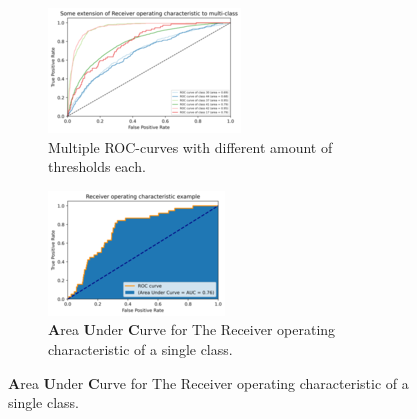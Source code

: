 \begin{figure}[H]
	\caption{ROC example}
	\begin{subfigure}[t]{0.49\hsize}\centering
		\includegraphics[width=1\linewidth]{bilder/ROC-Curve-Example.png}
		\caption{Multiple ROC-curves with different amount of thresholds each.}
		\label{plot:roc-multi}	
	\end{subfigure}%
	\hfill
	\begin{subfigure}[t]{0.49\hsize}\centering	
		\includegraphics[width=1\linewidth]{bilder/ROC-Area-Example.png}
		\caption{\textbf{A}rea \textbf{U}nder \textbf{C}urve for The Receiver operating characteristic of a single class.}
		\label{plot:ROC-single}	
	\end{subfigure}
\end{figure}


